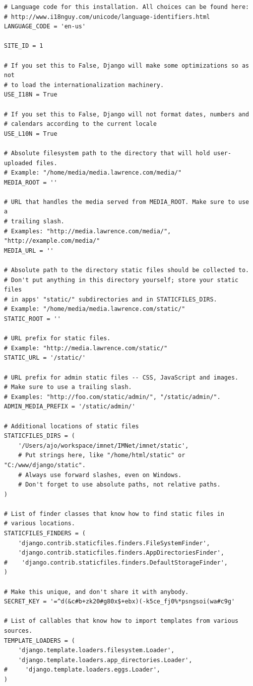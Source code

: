 \documentclass[letterpaper,12pt]{article}
\begin{document}
{\begin{verbatim}
# Language code for this installation. All choices can be found here:
# http://www.i18nguy.com/unicode/language-identifiers.html
LANGUAGE_CODE = 'en-us'

SITE_ID = 1

# If you set this to False, Django will make some optimizations so as not
# to load the internationalization machinery.
USE_I18N = True

# If you set this to False, Django will not format dates, numbers and
# calendars according to the current locale
USE_L10N = True

# Absolute filesystem path to the directory that will hold user-uploaded files.
# Example: "/home/media/media.lawrence.com/media/"
MEDIA_ROOT = ''

# URL that handles the media served from MEDIA_ROOT. Make sure to use a
# trailing slash.
# Examples: "http://media.lawrence.com/media/", "http://example.com/media/"
MEDIA_URL = ''

# Absolute path to the directory static files should be collected to.
# Don't put anything in this directory yourself; store your static files
# in apps' "static/" subdirectories and in STATICFILES_DIRS.
# Example: "/home/media/media.lawrence.com/static/"
STATIC_ROOT = ''

# URL prefix for static files.
# Example: "http://media.lawrence.com/static/"
STATIC_URL = '/static/'

# URL prefix for admin static files -- CSS, JavaScript and images.
# Make sure to use a trailing slash.
# Examples: "http://foo.com/static/admin/", "/static/admin/".
ADMIN_MEDIA_PREFIX = '/static/admin/'

# Additional locations of static files
STATICFILES_DIRS = (
    '/Users/ajo/workspace/imnet/IMNet/imnet/static',
    # Put strings here, like "/home/html/static" or "C:/www/django/static".
    # Always use forward slashes, even on Windows.
    # Don't forget to use absolute paths, not relative paths.
)

# List of finder classes that know how to find static files in
# various locations.
STATICFILES_FINDERS = (
    'django.contrib.staticfiles.finders.FileSystemFinder',
    'django.contrib.staticfiles.finders.AppDirectoriesFinder',
#    'django.contrib.staticfiles.finders.DefaultStorageFinder',
)

# Make this unique, and don't share it with anybody.
SECRET_KEY = '=^d(&c#b+zk20#g80x$+ebx)(-k5ce_fj0%*psngsoi(wa#c9g'

# List of callables that know how to import templates from various sources.
TEMPLATE_LOADERS = (
    'django.template.loaders.filesystem.Loader',
    'django.template.loaders.app_directories.Loader',
#     'django.template.loaders.eggs.Loader',
)


\end{verbatim}}
\end{document}
